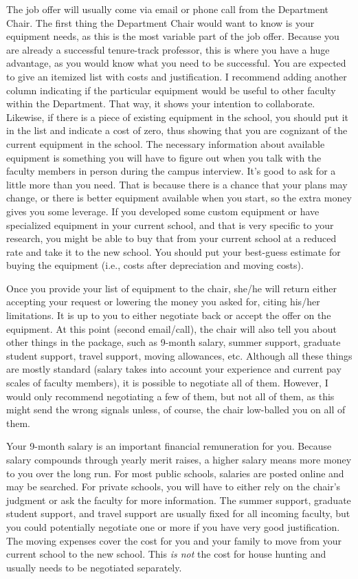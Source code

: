 \documentclass[14pt]{article}
\begin{document}
The job offer will usually come via email or phone call from the Department Chair. The first thing the Department Chair would want to know is your equipment needs, as this is the most variable part of the job offer. Because you are already a successful tenure-track professor, this is where you have a huge advantage, as you would know what you need to be successful. You are expected to give an itemized list with costs and justification. I recommend adding another column indicating if the particular equipment would be useful to other faculty within the Department. That way, it shows your intention to collaborate. Likewise, if there is a piece of existing equipment in the school, you should put it in the list and indicate a cost of zero, thus showing that you are cognizant of the current equipment in the school. The necessary information about available equipment is something you will have to figure out when you talk with the faculty members in person during the campus interview. It's good to ask for a little more than you need. That is because there is a chance that your plans may change, or there is better equipment available when you start, so the extra money gives you some leverage. If you developed some custom equipment or have specialized equipment in your current school, and that is very specific to your research, you might be able to buy that from your current school at a reduced rate and take it to the new school. You should put your best-guess estimate for buying the equipment (i.e., costs after depreciation and moving costs). 

Once you provide your list of equipment to the chair, she/he will return either accepting your request or lowering the money you asked for, citing his/her limitations. It is up to you to either negotiate back or accept the offer on the equipment. At this point (second email/call), the chair will also tell you about other things in the package, such as 9-month salary, summer support, graduate student support, travel support, moving allowances, etc. Although all these things are mostly standard (salary takes into account your experience and current pay scales of faculty members), it is possible to negotiate all of them. However, I would only recommend negotiating a few of them, but not all of them, as this might send the wrong signals unless, of course, the chair low-balled you on all of them. 

Your 9-month salary is an important financial remuneration for you. Because salary compounds through yearly merit raises, a higher salary means more money to you over the long run. For most public schools, salaries are posted online and may be searched. For private schools, you will have to either rely on the chair's judgment or ask the faculty for more information. The summer support, graduate student support, and travel support are usually fixed for all incoming faculty, but you could potentially negotiate one or more if you have very good justification. The moving expenses cover the cost for you and your family to move from your current school to the new school. This {\it is not} the cost for house hunting and usually needs to be negotiated separately.
\end{document}
